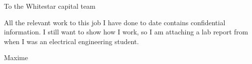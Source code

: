 \documentclass[english,12pt]{letter}
\begin{document}
	
	\begin{letter}{}
		\address{Montréal, Canada}
		
		\opening{To the Whitestar capital team}
		
		All the relevant work to this job I have done to date contains confidential information. I still want to show how I work, so I am attaching a lab report from when I was an electrical engineering student.  
		
		\closing{Maxime}
		
		
	\end{letter}
\end{document}

